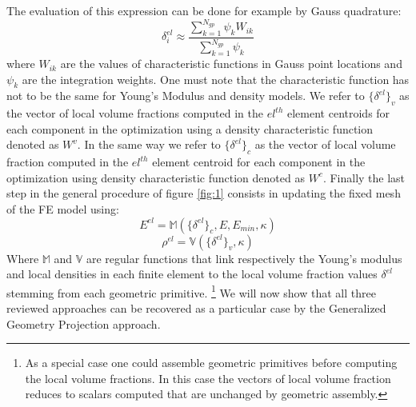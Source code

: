  The evaluation of this expression can be done for example by Gauss quadrature:
 \begin{equation}
    \delta_i^{el} \approx \frac{\sum_{k=1}^{N_{gp}}{\psi_kW_{ik}}}{\sum_{k=1}^{N_{gp}}{\psi_k}}
 \end{equation}
 where $W_{ik}$ are the values of characteristic functions in Gauss point locations and $\psi_k$ are the integration weights.
 One must note that the characteristic function has not to be the same for Young's Modulus and density models. We refer to $\lbrace\delta^{el}\rbrace_v$ as the vector of local volume fractions computed in the $el^{th}$ element centroids for each component in the optimization using a density characteristic function denoted as $W^v$. In the same way we refer to   $\lbrace\delta^{el}\rbrace_c$ as the vector of local volume fraction computed in the $el^{th}$ element centroid for each component in the optimization using density characteristic function denoted as $W^c$.
 Finally the last step in the general procedure of figure \ref{fig:1} consists in updating the fixed mesh of the FE model using:
 \begin{equation}
     E^{el}=\mathbb{M}(\lbrace\delta^{el}\rbrace_c,E,E_{min},\kappa)
 \end{equation}
  \begin{equation}
     \rho^{el}=\mathbb{V}(\lbrace\delta^{el}\rbrace_v,\kappa)
 \end{equation}
 Where $\mathbb{M}$ and $\mathbb{V}$ are regular functions that link respectively the Young's modulus and local densities in each finite element to the local volume fraction values $\delta^{el}$ stemming from each geometric primitive.  \footnote{As a special case one could assemble geometric primitives before computing the local volume fractions.
 In this case the vectors of local volume fraction reduces to scalars computed that are unchanged by geometric assembly.}
 We will now show that all three reviewed approaches can be recovered as a particular case by the Generalized Geometry Projection approach.
 
